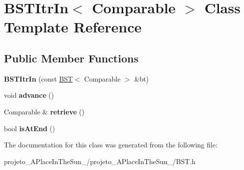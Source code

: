 \hypertarget{class_b_s_t_itr_in}{}\section{B\+S\+T\+Itr\+In$<$ Comparable $>$ Class Template Reference}
\label{class_b_s_t_itr_in}
\subsection*{Public Member Functions}
\begin{DoxyCompactItemize}
\item 
\hypertarget{class_b_s_t_itr_in_ac836e2f560fed9cc7ef8e5431a2836cc}{}\label{class_b_s_t_itr_in_ac836e2f560fed9cc7ef8e5431a2836cc} 
{\bfseries B\+S\+T\+Itr\+In} (const \hyperlink{class_b_s_t}{B\+ST}$<$ Comparable $>$ \&bt)
\item 
\hypertarget{class_b_s_t_itr_in_ac772d3ebbac748c5f8cf9bc659f2e32c}{}\label{class_b_s_t_itr_in_ac772d3ebbac748c5f8cf9bc659f2e32c} 
void {\bfseries advance} ()
\item 
\hypertarget{class_b_s_t_itr_in_ac7ac215c1247bd25fc1fdb8053826a32}{}\label{class_b_s_t_itr_in_ac7ac215c1247bd25fc1fdb8053826a32} 
Comparable \& {\bfseries retrieve} ()
\item 
\hypertarget{class_b_s_t_itr_in_a6f9a43217862c263a9bf15b9a08b889a}{}\label{class_b_s_t_itr_in_a6f9a43217862c263a9bf15b9a08b889a} 
bool {\bfseries is\+At\+End} ()
\end{DoxyCompactItemize}


The documentation for this class was generated from the following file\+:\begin{DoxyCompactItemize}
\item 
projeto\+\_\+\+A\+Place\+In\+The\+Sun\+\_/projeto\+\_\+\+A\+Place\+In\+The\+Sun\+\_/B\+S\+T.\+h\end{DoxyCompactItemize}
